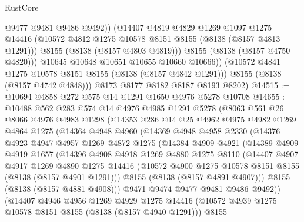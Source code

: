 \begin{lexlean}{RustCore}
\begin{coremodule}
                  @9477
                  @9481
                  @9486
                  @9492))
              (@14407
                @4819
                @4829
                @1269
                @1097
                @1275
                @14416
                (@10572 @4812 @1275 @10578 @8151 @8155 (@8138 (@8157 @4813 @1291)))
                @8155
                (@8138 (@8157 @4803 @4819)))
              @8155
              (@8138 (@8157 @4750 @4820)))
            @10645
            @10648
            @10651
            @10655
            @10660
            @10666))
        (@10572 @4841 @1275 @10578 @8151 @8155 (@8138 (@8157 @4842 @1291)))
        @8155
        (@8138 (@8157 @4742 @4848)))
      @8173
      @8177
      @8182
      @8187
      @8193
      @8202)
@14515 := @10694 @4858 @272 @575 @14 @1291 @1650 @4976 @5278 @10708
@14655 := @10488
    @562
    @283
    @574
    @14
    @4976
    @4985
    @1291
    @5278
    (@8063
      @561
      @26
      @8066
      @4976
      @4983
      @1298
      (@14353
        @286
        @14
        @25
        @4962
        @4975
        @4982
        @1269
        @4864
        @1275
        (@14364
          @4948
          @4960
          (@14369
            @4948
            @4958
            @2330
            (@14376
              @4923
              @4947
              @4957
              @1269
              @4872
              @1275
              (@14384
                @4909
                @4921
                (@14389
                  @4909
                  @4919
                  @1657
                  (@14396
                    @4908
                    @4918
                    @1269
                    @4880
                    @1275
                    @8110
                    (@14407
                      @4907
                      @4917
                      @1269
                      @4890
                      @1275
                      @14416
                      (@10572 @4900 @1275 @10578 @8151 @8155 (@8138 (@8157 @4901 @1291)))
                      @8155
                      (@8138 (@8157 @4891 @4907)))
                    @8155
                    (@8138 (@8157 @4881 @4908)))
                  @9471
                  @9474
                  @9477
                  @9481
                  @9486
                  @9492))
              (@14407
                @4946
                @4956
                @1269
                @4929
                @1275
                @14416
                (@10572 @4939 @1275 @10578 @8151 @8155 (@8138 (@8157 @4940 @1291)))
                @8155

\end{coremodule}
\end{lexlean}
